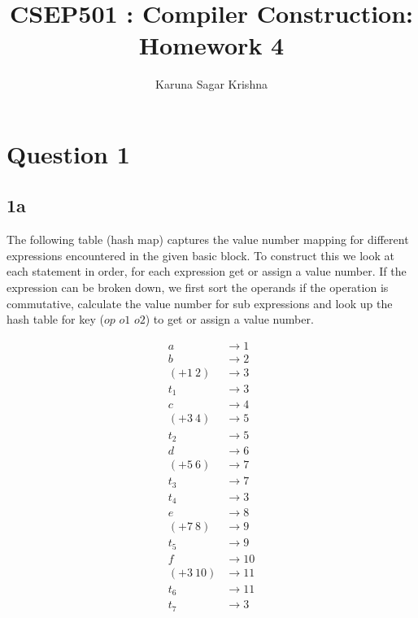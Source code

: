 \documentclass{article}
\title{CSEP501 : Compiler Construction: Homework 4}
\author{Karuna Sagar Krishna}
\begin{document}
    \maketitle

    \section*{Question 1}

    \subsection*{1a}
    The following table (hash map) captures the value number mapping for different expressions encountered in the given basic block. To construct this we look at each statement in order, for each expression get or assign a value number. If the expression can be broken down, we first sort the operands if the operation is commutative, calculate the value number for sub expressions and look up the hash table for key ($op$ $o1$ $o2$) to get or assign a value number.

    \begin{align*}
        a           & \rightarrow 1 \\
        b           & \rightarrow 2 \\
        (+ 1 \ 2)   & \rightarrow 3 \\
        t_1         & \rightarrow 3 \\
        c           & \rightarrow 4 \\
        (+ 3 \ 4)   & \rightarrow 5 \\
        t_2         & \rightarrow 5 \\
        d           & \rightarrow 6 \\
        (+ 5 \ 6)   & \rightarrow 7 \\
        t_3         & \rightarrow 7 \\
        t_4         & \rightarrow 3 \\
        e           & \rightarrow 8 \\
        (+ 7 \ 8)   & \rightarrow 9 \\
        t_5         & \rightarrow 9 \\
        f           & \rightarrow 10 \\
        (+ 3 \ 10)  & \rightarrow 11 \\
        t_6         & \rightarrow 11 \\
        t_7         & \rightarrow 3 \\
    \end{align*}
\end{document}
